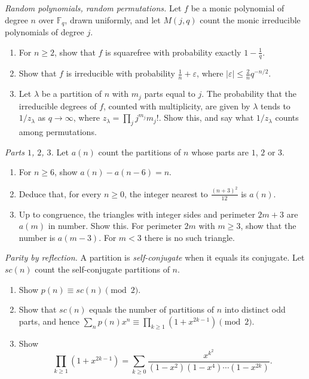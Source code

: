 \begin{exercise}[$\star\star$]\label{pb:randpoly}
\emph{Random polynomials, random permutations.} Let $f$ be a monic polynomial of degree $n$ over $\mathbb F_q$, drawn uniformly,
and let $M(j,q)$ count the monic irreducible polynomials of degree $j$.
\begin{enumerate}[label=(\alph*)]
\item For $n\ge2$, show that $f$ is squarefree with probability exactly $1-\frac1q$.
\item Show that $f$ is irreducible with probability $\frac1n+\varepsilon$, where $|\varepsilon|\le\frac2n q^{-n/2}$.
\item Let $\lambda$ be a partition of $n$ with $m_j$ parts equal to $j$. The probability that the irreducible degrees of $f$, counted with multiplicity, are given by
$\lambda$ tends to $1/z_\lambda$ as $q\to\infty$, where $z_\lambda=\prod_jj^{m_j}m_j!$. Show this, and say what
$1/z_\lambda$ counts among permutations.
\end{enumerate}
\end{exercise}

\begin{exercise}[$\star\star$]\label{pb:parts123}
\emph{Parts $1$, $2$, $3$.} Let $a(n)$ count the partitions of $n$ whose parts are $1$, $2$ or $3$.
\begin{enumerate}[label=(\alph*)]
\item For $n\ge6$, show $a(n)-a(n-6)=n$.
\item Deduce that, for every $n\ge0$, the integer nearest to $\frac{(n+3)^2}{12}$ is $a(n)$.
\item Up to congruence, the triangles with integer sides and perimeter $2m+3$ are $a(m)$ in number. Show this. For perimeter $2m$ with $m\ge3$, show that the number is $a(m-3)$. For $m<3$ there is no such triangle.
\end{enumerate}
\end{exercise}

\begin{exercise}[$\star$]\label{pb:selfconj}
\emph{Parity by reflection.} A partition is \emph{self-conjugate} when it equals its conjugate. Let $sc(n)$ count the
self-conjugate partitions of $n$.
\begin{enumerate}[label=(\alph*)]
\item Show $p(n)\equiv sc(n)\pmod2$.
\item Show that $sc(n)$ equals the number of partitions of $n$ into distinct odd parts, and hence
$\sum_np(n)x^n\equiv\prod_{k\ge1}(1+x^{2k-1})\pmod2$.
\item Show
\[
\prod_{k\ge1}(1+x^{2k-1})=\sum_{k\ge0}\frac{x^{k^2}}{(1-x^2)(1-x^4)\cdots(1-x^{2k})}.
\]
\end{enumerate}
\end{exercise}

